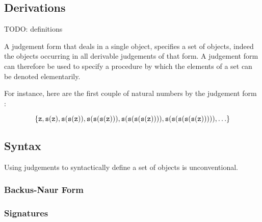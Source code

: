 \subsection{Derivations}









TODO: definitions

A judgement form that deals in a single object, specifies a set of objects,
indeed the objects occurring in all derivable judgements of that form. A
judgement form can therefore be used to specify a procedure by which the
elements of a set can be denoted elementarily.


For instance, here are the first couple of natural numbers by the judgement
form :

$$\left\{{\mathtt{z}, \mathtt{s}(\mathtt{z}), \mathtt{s}(\mathtt{s}(\mathtt{z})),
\mathtt{s}(\mathtt{s}(\mathtt{s}(\mathtt{z}))),
\mathtt{s}(\mathtt{s}(\mathtt{s}(\mathtt{s}(\mathtt{z})))),
\mathtt{s}(\mathtt{s}(\mathtt{s}(\mathtt{s}(\mathtt{s}(\mathtt{z}))))), \ldots }\right\}$$

\subsection{Syntax}

Using judgements to syntactically define a set of objects is unconventional.

\subsubsection{Backus-Naur Form}

\subsubsection{Signatures}

